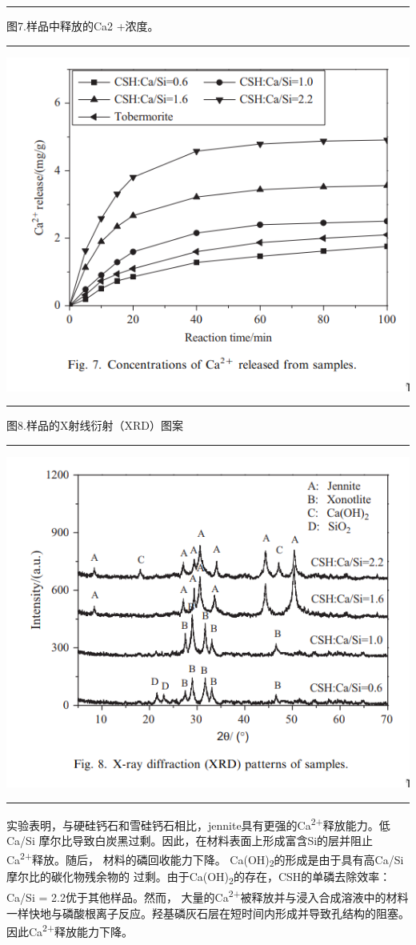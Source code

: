 \documentclass[11pt]{article}
\begin{document}
\noindent\rule{\textwidth}{0.5pt}
图7.样品中释放的Ca2 +浓度。

\noindent\rule{\textwidth}{0.5pt}
\includegraphics[scale=0.5]{fig.7.png}

\noindent\rule{\textwidth}{0.5pt}
图8.样品的X射线衍射（XRD）图案

\noindent\rule{\textwidth}{0.5pt}
\includegraphics[scale=0.5]{fig.8.png}

\noindent\rule{\textwidth}{0.5pt}

实验表明，与硬硅钙石和雪硅钙石相比，jennite具有更强的Ca\textsuperscript{2+}释放能力。低Ca/Si
摩尔比导致白炭黑过剩。因此，在材料表面上形成富含Si的层并阻止Ca\textsuperscript{2+}释放。随后，
材料的磷回收能力下降。 Ca(OH)\textsubscript{2}的形成是由于具有高Ca/Si摩尔比的碳化物残余物的
过剩。由于Ca(OH)\textsubscript{2}的存在，CSH的单磷去除效率：Ca/Si = 2.2优于其他样品。然而，
大量的Ca\textsuperscript{2+}被释放并与浸入合成溶液中的材料一样快地与磷酸根离子反应。羟基磷灰石层在短时间内形成并导致孔结构的阻塞。因此Ca\textsuperscript{2+}释放能力下降。
\end{document}
